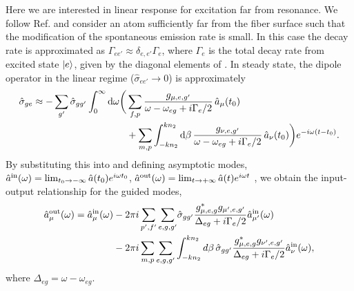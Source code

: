 \documentclass[preprint,aps,pra,onecolumn]{revtex4-1} %
\newcommand{\inp}{{\rm in}}
\newcommand{\out}{{\rm out}}
\newcommand{\comment}[1]{{\color{Maroon} #1}}
\begin{document}
Here we are interested in linear response for excitation far from resonance. We follow Ref. \cite{le_kien_propagation_2014} and consider an atom sufficiently far from the fiber surface such that the modification of the spontaneous emission rate is small.   In this case the decay rate is approximated as $\Gamma_{ee'} \approx \delta_{e,e'} \Gamma_{e}$, where $\Gamma_e$ is the total decay rate from excited state $\lvert{e}\rangle$, given by the diagonal elements of .  In steady state, the dipole operator in the linear regime ($\hat{\sigma}_{ee'} \rightarrow 0 $) is approximately
	\begin{align}
		\hat{\sigma}_{ge} \approx -\sum_{g'} \hat{\sigma}_{gg'}\int_0^{\infty}\mathrm{d}\omega \bigg( & \sum_{f,p}  
\frac{g_{\mu, e,g'}}{\omega-\omega_{eg} + i \Gamma_{e}/2  }\, \hat{a}_\mu (t_0) \\
	&+\sum_{m,p} \int_{-kn_2}^{kn_2}\mathrm{d}\beta \, \frac{g_{\nu, e,g'}}{\omega-\omega_{eg} + i \Gamma_{e}/2 } \,\hat{a}_\nu (t_0)  \bigg)e^{-i\omega (t-t_0)} . \nonumber
	\end{align}
By substituting this into  and defining asymptotic modes, \comment{ $\hat{a}^{\inp}(\omega) = \lim_{t_0\rightarrow -\infty} \hat{a}(t_0) e^{i\omega t_0}$, $\hat{a}^{\out}(\omega) = \lim_{t\rightarrow +\infty} \hat{a}(t) e^{i\omega t}$ \cite{fan_input-output_2010}}, we obtain the input-output relationship for the guided modes,
	\begin{align} \label{Eq::aout}
		\hat{a}^{\out}_\mu (\omega) = \hat{a}^{\inp}_\mu (\omega) &- 2\pi i\sum_{p',f'} 
\sum_{e,g,g'}\!\hat{\sigma}_{gg'}\frac{ g_{\mu,e,g}^* g_{\mu',e,g'}}{ \Delta_{eg} + i \Gamma_{e}/2 }\hat{a}^{\inp}_{\mu'}(\omega) \\
&- 2\pi i\sum_{m,p} \sum_{e,g,g'} \int^{kn_2}_{-kn_2} d\beta \,\hat{\sigma}_{gg'}\frac{ g_{\mu,e,g}^* g_{\nu',e,g'}}{ \Delta_{eg} + i \Gamma_{e}/2 }\hat{a}^{\inp}_{\nu}(\omega),\nn
	\end{align}
where $\Delta_{eg} = \omega - \omega_{eg}$. 
\end{document}
